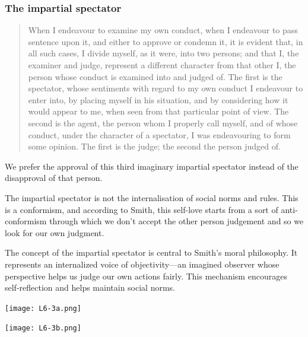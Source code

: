         \subsubsection{The impartial spectator}

            \begin{quote}
                When I endeavour to examine my own conduct, when I endeavour to pass sentence upon it, and either to approve or condemn it, it is evident that, in all such cases, I divide myself, as it were, into two persons; and that I, the examiner and judge, represent a different character from that other I, the person whose conduct is examined into and judged of. The first is the spectator, whose sentiments with regard to my own conduct I endeavour to enter into, by placing myself in his situation, and by considering how it would appear to me, when seen from that particular point of view. The second is the agent, the person whom I properly call myself, and of whose conduct, under the character of a spectator, I was endeavouring to form some opinion. The first is the judge; the second the person judged of.
            \end{quote}

            We prefer the approval of this third imaginary impartial spectator instead of the disapproval of that person.

            \begin{remark}
                The impartial spectator is not the internalisation of social norms and rules. This is a conformism, and according to Smith, this self-love starts from a sort of anti-conformism through which we don’t accept the other person judgement and so we look for our own judgment. 
            \end{remark}

            The concept of the impartial spectator is central to Smith’s moral philosophy. It represents an internalized voice of objectivity—an imagined observer whose perspective helps us judge our own actions fairly. This mechanism encourages self-reflection and helps maintain social norms.

            \begin{minipage}{0.48\textwidth}
                \begin{center}
                    \texttt{[image: L6-3a.png]}
                \end{center}
            \end{minipage}
            \begin{minipage}{0.04\textwidth}
                
            \end{minipage}
            \begin{minipage}{0.48\textwidth}
                \begin{center}
                    \texttt{[image: L6-3b.png]}
                \end{center}
            \end{minipage}

